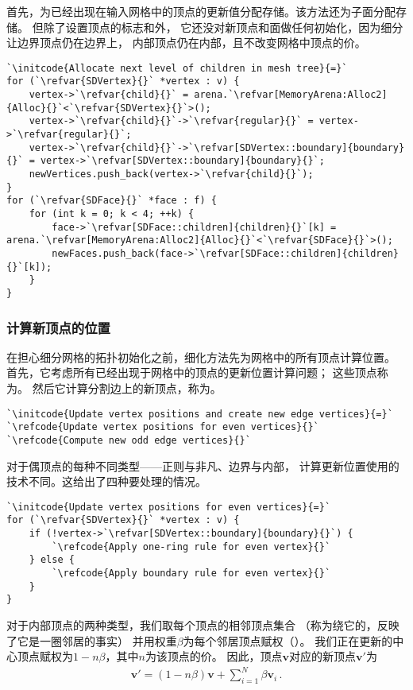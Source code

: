首先，为已经出现在输入网格中的顶点的更新值分配存储。该方法还为子面分配存储。
但除了设置顶点的标志和外，
它还没对新顶点和面做任何初始化，因为细分让边界顶点仍在边界上，
内部顶点仍在内部，且不改变网格中顶点的价。
\begin{lstlisting}
`\initcode{Allocate next level of children in mesh tree}{=}`
for (`\refvar{SDVertex}{}` *vertex : v) {
    vertex->`\refvar{child}{}` = arena.`\refvar[MemoryArena:Alloc2]{Alloc}{}`<`\refvar{SDVertex}{}`>();
    vertex->`\refvar{child}{}`->`\refvar{regular}{}` = vertex->`\refvar{regular}{}`;
    vertex->`\refvar{child}{}`->`\refvar[SDVertex::boundary]{boundary}{}` = vertex->`\refvar[SDVertex::boundary]{boundary}{}`;
    newVertices.push_back(vertex->`\refvar{child}{}`);
}
for (`\refvar{SDFace}{}` *face : f) {
    for (int k = 0; k < 4; ++k) {
        face->`\refvar[SDFace::children]{children}{}`[k] = arena.`\refvar[MemoryArena:Alloc2]{Alloc}{}`<`\refvar{SDFace}{}`>();
        newFaces.push_back(face->`\refvar[SDFace::children]{children}{}`[k]);
    }
}
\end{lstlisting}

\subsubsection*{计算新顶点的位置}
在担心细分网格的拓扑初始化之前，细化方法先为网格中的所有顶点计算位置。
首先，它考虑所有已经出现于网格中的顶点的更新位置计算问题；
这些顶点称为。
然后它计算分割边上的新顶点，称为。
\begin{lstlisting}
`\initcode{Update vertex positions and create new edge vertices}{=}`
`\refcode{Update vertex positions for even vertices}{}`
`\refcode{Compute new odd edge vertices}{}`
\end{lstlisting}

对于偶顶点的每种不同类型——正则与非凡、边界与内部，
计算更新位置使用的技术不同。这给出了四种要处理的情况。
\begin{lstlisting}
`\initcode{Update vertex positions for even vertices}{=}`
for (`\refvar{SDVertex}{}` *vertex : v) {
    if (!vertex->`\refvar[SDVertex::boundary]{boundary}{}`) {
        `\refcode{Apply one-ring rule for even vertex}{}`
    } else {
        `\refcode{Apply boundary rule for even vertex}{}`
    }
}
\end{lstlisting}

对于内部顶点的两种类型，我们取每个顶点的相邻顶点集合
（称为绕它的，反映了它是一圈邻居的事实）
并用权重$\beta$为每个邻居顶点赋权（）。
我们正在更新的中心顶点赋权为$1-n\beta$，其中$n$为该顶点的价。
因此，顶点$\bm v$对应的新顶点$\bm v'$为
\begin{align*}
    \bm v'=(1-n\beta)\bm v+\sum\limits_{i=1}^{N}{\beta \bm v_i}\, .
\end{align*}

